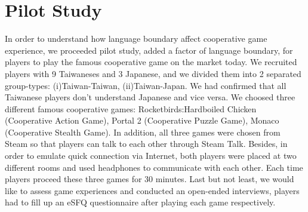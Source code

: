 \section{Pilot Study}


In order to understand how language boundary affect cooperative game experience, we proceeded pilot study, added a factor of language boundary, for players to play the famous cooperative game on the market today. We recruited players with 9 Taiwaneses and 3 Japanese, and we divided them into 2 separated group-types: (i)Taiwan-Taiwan, (ii)Taiwan-Japan. We had confirmed that all Taiwanese players don't understand Japanese and vice versa. We choosed three different famous cooperative games: Rocketbirds:Hardboiled Chicken (Cooperative Action Game), Portal 2 (Cooperative Puzzle Game), Monaco (Cooperative Stealth Game). In addition, all three games were chosen from Steam\cite{PS1} so that players can talk to each other through Steam Talk. Besides, in order to emulate quick connection via Internet, both players were placed at two different rooms and used headphones to communicate with each other. Each time players proceed these three games for 30 minutes. Last but not least, we would like to assess game experiences and conducted an open-ended interviews, players had to fill up an eSFQ\cite{PS2} questionnaire after playing each game respectively.

